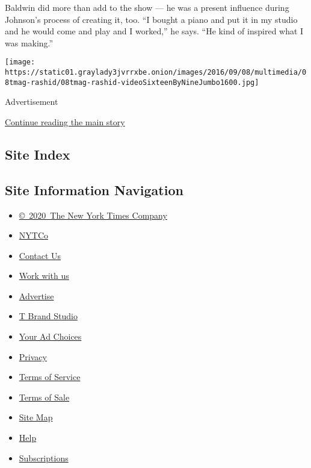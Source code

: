 Baldwin did more than add to the show --- he was a present influence
during Johnson's process of creating it, too. ``I bought a piano and put
it in my studio and he would come and play and I worked,'' he says. ``He
kind of inspired what I was making.''

\texttt{[image: https://static01.graylady3jvrrxbe.onion/images/2016/09/08/multimedia/08tmag-rashid/08tmag-rashid-videoSixteenByNineJumbo1600.jpg]}

Advertisement

\protect\hyperlink{after-bottom}{Continue reading the main story}

\hypertarget{site-index}{%
\subsection{Site Index}\label{site-index}}

\hypertarget{site-information-navigation}{%
\subsection{Site Information
Navigation}\label{site-information-navigation}}

\begin{itemize}
\tightlist
\item
  \href{https://help.nytimes3xbfgragh.onion/hc/en-us/articles/115014792127-Copyright-notice}{©~2020~The
  New York Times Company}
\end{itemize}

\begin{itemize}
\tightlist
\item
  \href{https://www.nytco.com/}{NYTCo}
\item
  \href{https://help.nytimes3xbfgragh.onion/hc/en-us/articles/115015385887-Contact-Us}{Contact
  Us}
\item
  \href{https://www.nytco.com/careers/}{Work with us}
\item
  \href{https://nytmediakit.com/}{Advertise}
\item
  \href{http://www.tbrandstudio.com/}{T Brand Studio}
\item
  \href{https://www.nytimes3xbfgragh.onion/privacy/cookie-policy\#how-do-i-manage-trackers}{Your
  Ad Choices}
\item
  \href{https://www.nytimes3xbfgragh.onion/privacy}{Privacy}
\item
  \href{https://help.nytimes3xbfgragh.onion/hc/en-us/articles/115014893428-Terms-of-service}{Terms
  of Service}
\item
  \href{https://help.nytimes3xbfgragh.onion/hc/en-us/articles/115014893968-Terms-of-sale}{Terms
  of Sale}
\item
  \href{https://spiderbites.nytimes3xbfgragh.onion}{Site Map}
\item
  \href{https://help.nytimes3xbfgragh.onion/hc/en-us}{Help}
\item
  \href{https://www.nytimes3xbfgragh.onion/subscription?campaignId=37WXW}{Subscriptions}
\end{itemize}
